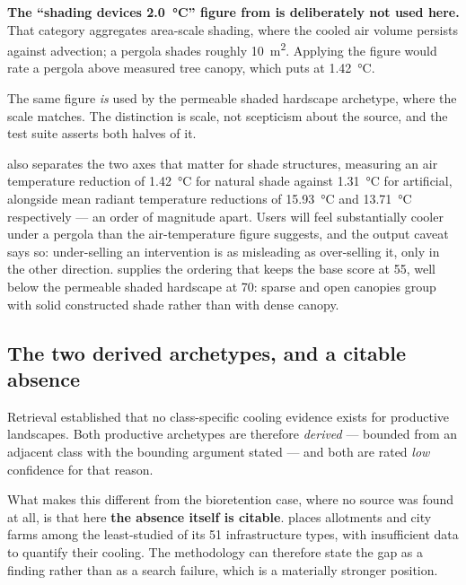 \begin{keynote}
\noindent\textbf{The ``shading devices \qty{2.0}{\degreeCelsius}'' figure from
\textcite{keravec2026} is deliberately not used here.} That category aggregates
area-scale shading, where the cooled air volume persists against advection; a
pergola shades roughly \qty{10}{\metre\squared}. Applying the figure would rate
a pergola above measured tree canopy, which \textcite{ouyang2024} puts at
\qty{1.42}{\degreeCelsius}.

The same figure \emph{is} used by the permeable shaded hardscape archetype,
where the scale matches. The distinction is scale, not scepticism about the
source, and the test suite asserts both halves of it.
\end{keynote}

\textcite{ouyang2024} also separates the two axes that matter for shade
structures, measuring an air temperature reduction of
\qty{1.42}{\degreeCelsius} for natural shade against
\qty{1.31}{\degreeCelsius} for artificial, alongside mean radiant temperature
reductions of \qty{15.93}{\degreeCelsius} and \qty{13.71}{\degreeCelsius}
respectively --- an order of magnitude apart. Users will feel substantially
cooler under a pergola than the air-temperature figure suggests, and the output
caveat says so: under-selling an intervention is as misleading as over-selling
it, only in the other direction. \textcite{colter2019} supplies the ordering
that keeps the base score at 55, well below the permeable shaded hardscape at
70: sparse and open canopies group with solid constructed shade rather than
with dense canopy.

\subsection{The two derived archetypes, and a citable absence}
\label{sec:derived-archetypes}

Retrieval established that no class-specific cooling evidence exists for
productive landscapes. Both productive archetypes are therefore \emph{derived}
--- bounded from an adjacent class with the bounding argument stated --- and
both are rated \emph{low} confidence for that reason.

What makes this different from the bioretention case, where no source was found
at all, is that here \textbf{the absence itself is citable}.
\textcite{kumar2024} places allotments and city farms among the least-studied
of its \num{51} infrastructure types, with insufficient data to quantify their
cooling. The methodology can therefore state the gap as a finding rather than
as a search failure, which is a materially stronger position.

